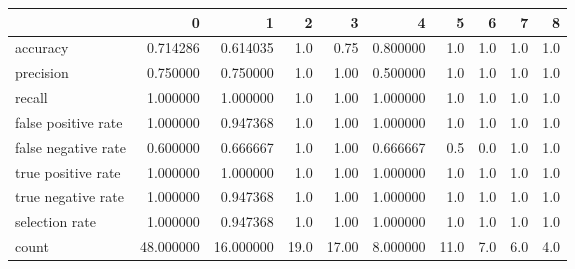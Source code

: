 \begin{tabular}{lrrrrrrrrr}
\toprule
{} &          0 &          1 &     2 &      3 &         4 &     5 &    6 &    7 &    8 \\
\midrule
accuracy            &   0.714286 &   0.614035 &   1.0 &   0.75 &  0.800000 &   1.0 &  1.0 &  1.0 &  1.0 \\
precision           &   0.750000 &   0.750000 &   1.0 &   1.00 &  0.500000 &   1.0 &  1.0 &  1.0 &  1.0 \\
recall              &   1.000000 &   1.000000 &   1.0 &   1.00 &  1.000000 &   1.0 &  1.0 &  1.0 &  1.0 \\
false positive rate &   1.000000 &   0.947368 &   1.0 &   1.00 &  1.000000 &   1.0 &  1.0 &  1.0 &  1.0 \\
false negative rate &   0.600000 &   0.666667 &   1.0 &   1.00 &  0.666667 &   0.5 &  0.0 &  1.0 &  1.0 \\
true positive rate  &   1.000000 &   1.000000 &   1.0 &   1.00 &  1.000000 &   1.0 &  1.0 &  1.0 &  1.0 \\
true negative rate  &   1.000000 &   0.947368 &   1.0 &   1.00 &  1.000000 &   1.0 &  1.0 &  1.0 &  1.0 \\
selection rate      &   1.000000 &   0.947368 &   1.0 &   1.00 &  1.000000 &   1.0 &  1.0 &  1.0 &  1.0 \\
count               &  48.000000 &  16.000000 &  19.0 &  17.00 &  8.000000 &  11.0 &  7.0 &  6.0 &  4.0 \\
\bottomrule
\end{tabular}
